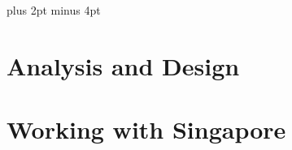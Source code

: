 \documentclass[a4paper,titlepage,draft]{article}
\begin{document}
\parindent=0pt %
\parskip=8pt plus 2pt minus 4pt

\setcounter{page}{1}

\tableofcontents
\newpage

\begin{spacing}{1.15}
%
\section{Analysis and Design}



\pagebreak
\section{Working with Singapore}


\end{spacing}
\pagebreak


\newpage
\appendix


%
\end{document}
